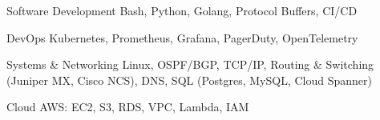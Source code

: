 

\begin{cvskills}

  \cvskill
    {Software Development} %
    {Bash, Python, Golang, Protocol Buffers, CI/CD} %

  \cvskill
    {DevOps} %
    {Kubernetes, Prometheus, Grafana, PagerDuty, OpenTelemetry} %

  \cvskill
    {Systems \& Networking} %
    {Linux, OSPF/BGP, TCP/IP, Routing \& Switching (Juniper MX, Cisco NCS), DNS, SQL (Postgres, MySQL, Cloud Spanner)} %


  \cvskill
    {Cloud} %
    {AWS: EC2, S3, RDS, VPC, Lambda, IAM} %

\end{cvskills}
